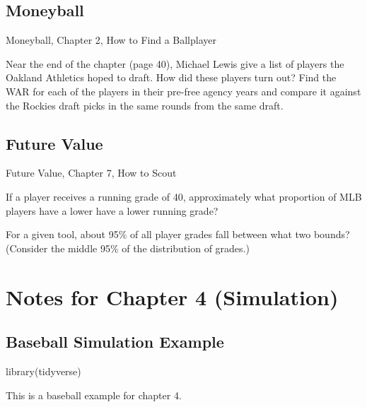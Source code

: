 \documentclass[
  11pt,
]{book}
\newenvironment{Shaded}{\begin{snugshade}}{\end{snugshade}}
\newcommand{\FunctionTok}[1]{\textcolor[rgb]{0.00,0.00,0.00}{#1}}
\newcommand{\NormalTok}[1]{#1}
\theoremstyle{definition}
\theoremstyle{definition}
\theoremstyle{definition}
\theoremstyle{definition}
\theoremstyle{remark}
\begin{document}
\hypertarget{moneyball}{%
\subsection{Moneyball}\label{moneyball}}

Moneyball, Chapter 2, How to Find a Ballplayer \citep{lewis2004moneyball}

Near the end of the chapter (page 40), Michael Lewis give a list of players the Oakland Athletics hoped to draft. How did these players turn out? Find the WAR for each of the players in their pre-free agency years and compare it against the Rockies draft picks in the same rounds from the same draft.

\hypertarget{future-value}{%
\subsection{Future Value}\label{future-value}}

Future Value, Chapter 7, How to Scout \citep{longenhagen2020future}

If a player receives a running grade of 40, approximately what proportion of MLB players have a lower have a lower running grade?

For a given tool, about 95\% of all player grades fall between what two bounds? (Consider the middle 95\% of the distribution of grades.)

\hypertarget{notes-for-chapter-4-simulation}{%
\section{Notes for Chapter 4 (Simulation)}\label{notes-for-chapter-4-simulation}}

\hypertarget{baseball-simulation-example}{%
\subsection{Baseball Simulation Example}\label{baseball-simulation-example}}

\begin{Shaded}
\begin{Highlighting}[]
\FunctionTok{library}\NormalTok{(tidyverse)}
\end{Highlighting}
\end{Shaded}

This is a baseball example for chapter 4.
\end{document}
